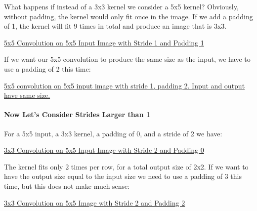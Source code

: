 What happens if instead of a 3x3 kernel we consider a 5x5 kernel? Obviously, without padding, the kernel would only fit once in the image. If we add a padding of 1, the kernel will fit 9 times in total and produce an image that is 3x3. \newline

\href{run:./img/cnn/depth/i5-k5-s1-p1.gif}{5x5 Convolution on 5x5 Input Image with Stride 1 and Padding 1} \newline

If we want our 5x5 convolution to produce the same size as the input, we have to use a padding of 2 this time: \newline

\href{run:./img/cnn/depth/i5-k5-s1-p2.gif}{5x5 convolution on 5x5 input image with stride 1, padding 2. Input and output have same size.} \newline


\paragraph{Now Let's Consider Strides Larger than 1}

For a 5x5 input, a 3x3 kernel, a padding of 0, and a stride of 2 we have: \newline

\href{run:./img/cnn//epth/i5-k3-s2-p0.gif}{3x3 Convolution on 5x5 Input Image with Stride 2 and Padding 0} \newline

The kernel fits only 2 times per row, for a total output size of 2x2. If we want to have the output size equal to the input size we need to use a padding of 3 this time, but this does not make much sense: \newline

\href{run:./img/cnn/depth/i5-k3-s2-p3.gif}{3x3 Convolution on 5x5 Image with Stride 2 and Padding 2} \newline

